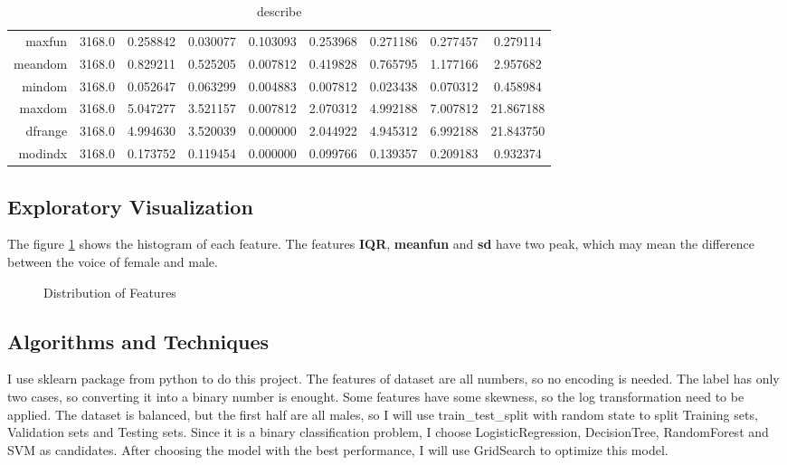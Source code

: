\documentclass[12pt,a4paper]{article}
\theoremstyle{definition}
\begin{document}
\begin{table}[htbp]
\begin{tabular}{r|lccccccc}
    maxfun   & 3168.0 & 0.258842  & 0.030077   & 0.103093 & 0.253968 & 0.271186 & 0.277457  & 0.279114       \\
    meandom  & 3168.0 & 0.829211  & 0.525205   & 0.007812 & 0.419828 & 0.765795 & 1.177166  & 2.957682       \\
    mindom   & 3168.0 & 0.052647  & 0.063299   & 0.004883 & 0.007812 & 0.023438 & 0.070312  & 0.458984       \\
    maxdom   & 3168.0 & 5.047277  & 3.521157   & 0.007812 & 2.070312 & 4.992188 & 7.007812  & 21.867188      \\
    dfrange  & 3168.0 & 4.994630  & 3.520039   & 0.000000 & 2.044922 & 4.945312 & 6.992188  & 21.843750      \\
    modindx  & 3168.0 & 0.173752  & 0.119454   & 0.000000 & 0.099766 & 0.139357 & 0.209183  & 0.932374       \\
    \end{tabular}
    \caption{\label{tab:describe_table}describe}
\end{table}


\subsection{Exploratory Visualization}

The figure \ref{fig:feature_distribution} shows the histogram of each feature. The features \textbf{IQR}, \textbf{meanfun} and \textbf{sd} have two peak, which may mean the difference between the voice of female and male.

\begin{figure}[htpb]
    \centering
    
    \caption{Distribution of Features}
    \label{fig:feature_distribution}
\end{figure}

\subsection{Algorithms and Techniques}

I use sklearn package from python to do this project. The features of dataset are all numbers, so no encoding is needed. The label has only two cases, so converting it into a binary number is enought. Some features have some skewness, so the log transformation need to be applied. The dataset is balanced, but the first half are all males, so I will use train\_test\_split with random state to split Training sets, Validation sets and Testing sets. Since it is a binary classification problem, I choose LogisticRegression, DecisionTree, RandomForest and SVM as candidates. After choosing the model with the best performance, I will use GridSearch to optimize this model.
\end{document}
